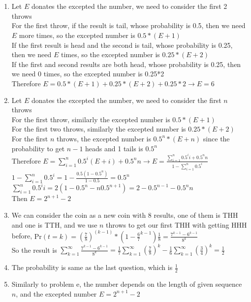 \documentclass[10pt,a4paper]{article}
\begin{document}
\newpage
\section{}
\begin{enumerate}[a]
    \item Let $E$ donates the excepted the number, we need to consider the first 2 throws
    \\For the first throw, if the result is tail, whose probability is 0.5, then we need $E$ more times, so the excepted number is $0.5*(E+1)$
    \\If the first result is head and the second is tail, whose probability is 0.25, then we need $E$ times, so the excepted number is $0.25*(E+2)$
    \\If the first and second results are both head, whose probability is 0.25, then we need 0 times, so the excepted number is 0.25*2
    \\Therefore $E=0.5*(E+1)+0.25*(E+2)+0.25*2\rightarrow E=6$
    \item Let $E$ donates the excepted the number, we need to consider the first $n$ throws
    \\For the first throw, similarly the excepted number is $0.5*(E+1)$
    \\For the first two throws, similarly the excepted number is $0.25*(E+2)$
    \\For the first $n$ throws, the excepted number is $0.5^n*(E+n)$ since the probability to get $n-1$ heads and 1 tails is $0.5^n$
    \\Therefore $E=\sum_{i=1}^n0.5^i(E+i)+0.5^nn\rightarrow E=\frac{\sum_{i=1}^n 0.5^ii+0.5^nn}{1-\sum_{i=1}^n0.5^i}$
    \\$1-\sum_{i=1}^n0.5^i=1-\frac{0.5(1-0.5^n)}{1-0.5}=0.5^n$
    \\$\sum_{i=1}^n 0.5^ii=2(1-0.5^n-n0.5^{n+1})=2-0.5^{n-1}-0.5^nn$
    \\Then $E=2^{n+1}-2$
    \item We can consider the coin as a new coin with 8 results, one of them is THH and one is TTH, and we use $n$ throws to get our first THH with getting HHH before, $\mathrm{Pr}(t=k)=(\frac{7}{8})^{(k-1)}*(1-\frac{6}{7}^{k-1})\frac{1}{8}=\frac{7^{k-1}-6^{k-1}}{8^{k}}$
    \\So the result is $\sum_{k=1}^\infty\frac{7^{k-1}-6^{k-1}}{8^{k}}=\frac{1}{7}\sum_{k=1}^\infty(\frac{7}{8})^k-\frac{1}{6}\sum_{k=1}^\infty(\frac{3}{4})^k=\frac{1}{2}$
    \item The probability is same as the last question, which is $\frac{1}{2}$
    \item Similarly to problem e, the number depends on the length of given sequence $n$, and the excepted number $E=2^{n+1}-2$
\end{enumerate}
\end{document}

